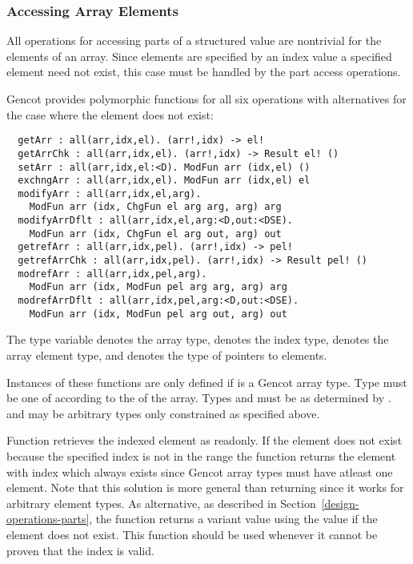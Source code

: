 \subsubsection{Accessing Array Elements}

All operations for accessing parts of a structured value are nontrivial for the elements of an array. Since elements are 
specified by an index value a specified element need not exist, this case must be handled by the part access operations.

Gencot provides polymorphic functions for all six operations with alternatives for the case where the element does not 
exist:
\begin{verbatim}
  getArr : all(arr,idx,el). (arr!,idx) -> el!
  getArrChk : all(arr,idx,el). (arr!,idx) -> Result el! ()
  setArr : all(arr,idx,el:<D). ModFun arr (idx,el) ()
  exchngArr : all(arr,idx,el). ModFun arr (idx,el) el
  modifyArr : all(arr,idx,el,arg). 
    ModFun arr (idx, ChgFun el arg arg, arg) arg
  modifyArrDflt : all(arr,idx,el,arg:<D,out:<DSE). 
    ModFun arr (idx, ChgFun el arg out, arg) out
  getrefArr : all(arr,idx,pel). (arr!,idx) -> pel!
  getrefArrChk : all(arr,idx,pel). (arr!,idx) -> Result pel! ()
  modrefArr : all(arr,idx,pel,arg). 
    ModFun arr (idx, ModFun pel arg arg, arg) arg
  modrefArrDflt : all(arr,idx,pel,arg:<D,out:<DSE). 
    ModFun arr (idx, ModFun pel arg out, arg) out
\end{verbatim}
The type variable  denotes the array type,  denotes the index type,
 denotes the array element type, and  denotes the type of pointers to elements. 

Instances of these functions are only defined if  is a Gencot array type. Type 
must be one of  according to the  of the array. Types  and
 must be as determined by .  and  may be arbitrary types
only constrained as specified above.

Function  retrieves the indexed element as readonly. If the element does not exist because
the specified index is not in the range  the function returns the element with 
index  which always exists since Gencot array types must have atleast one element. Note that
this solution is more general than returning  since it works for arbitrary element types.
As alternative, as described in Section~\ref{design-operations-parts}, the function
 returns a variant value using the value  if the element does not exist.
This function should be used whenever it cannot be proven that the index is valid.

